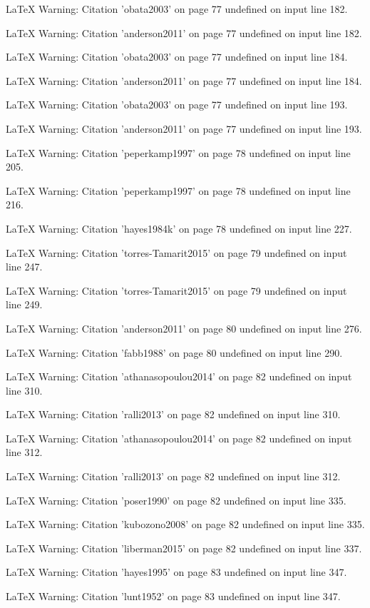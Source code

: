 LaTeX Warning: Citation 'obata2003' on page 77 undefined on input line 182.


LaTeX Warning: Citation 'anderson2011' on page 77 undefined on input line 182.


LaTeX Warning: Citation 'obata2003' on page 77 undefined on input line 184.


LaTeX Warning: Citation 'anderson2011' on page 77 undefined on input line 184.


LaTeX Warning: Citation 'obata2003' on page 77 undefined on input line 193.


LaTeX Warning: Citation 'anderson2011' on page 77 undefined on input line 193.


LaTeX Warning: Citation 'peperkamp1997' on page 78 undefined on input line 205.


LaTeX Warning: Citation 'peperkamp1997' on page 78 undefined on input line 216.


LaTeX Warning: Citation 'hayes1984k' on page 78 undefined on input line 227.


LaTeX Warning: Citation 'torres-Tamarit2015' on page 79 undefined on input line 247.


LaTeX Warning: Citation 'torres-Tamarit2015' on page 79 undefined on input line 249.


LaTeX Warning: Citation 'anderson2011' on page 80 undefined on input line 276.


LaTeX Warning: Citation 'fabb1988' on page 80 undefined on input line 290.


LaTeX Warning: Citation 'athanasopoulou2014' on page 82 undefined on input line 310.


LaTeX Warning: Citation 'ralli2013' on page 82 undefined on input line 310.


LaTeX Warning: Citation 'athanasopoulou2014' on page 82 undefined on input line 312.


LaTeX Warning: Citation 'ralli2013' on page 82 undefined on input line 312.


LaTeX Warning: Citation 'poser1990' on page 82 undefined on input line 335.


LaTeX Warning: Citation 'kubozono2008' on page 82 undefined on input line 335.


LaTeX Warning: Citation 'liberman2015' on page 82 undefined on input line 337.


LaTeX Warning: Citation 'hayes1995' on page 83 undefined on input line 347.


LaTeX Warning: Citation 'lunt1952' on page 83 undefined on input line 347.


